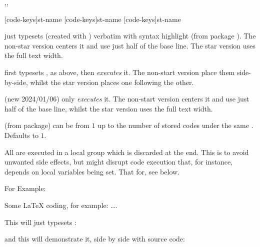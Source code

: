 \documentclass{article}
\begin{document}
\begin{codedescribe}[code,update=2024/01/06,update=2025/04/29]{\tscode*,\tsdemo*,\tsresult*}
\begin{codesyntax}%
		\tsmacro{\tscode*}[code-keys]{st-name}
		\tsmacro{\tsdemo*}[code-keys]{st-name}
		\tsmacro{\tsresult*}[code-keys]{st-name}
\end{codesyntax}
\tsmacro{\tscode*}{} just typesets  (created with ) verbatim with syntax highlight (from  package \cite{listings}). The non-star version centers it and use just half of the base line. The star version uses the full text width.

\tsmacro{\tsdemo*}{} first typesets , as above, then \emph{executes} it. The non-start version place them side-by-side, whilst the star version places one following the other.

(new 2024/01/06) \tsmacro{\tsresult*}{} only \emph{executes} it. The non-start version centers it and use just half of the base line, whilst the star version uses the full text width.
\end{codedescribe}

\begin{tsremark}
  (from  package)  can be from $1$ up to the number of stored codes under the same . Defaults to $1$.
\end{tsremark}

\begin{tsremark}
  All are executed in a local group which is discarded at the end. This is to avoid unwanted side effects, but might disrupt code execution that, for instance, depends on local variables being set. That for, see \tsobj{\tsexec} below.
\end{tsremark}

For Example:
\begin{codestore}[st=democodestore]
\begin{codestore}[stmeta]
		Some \LaTeX{} coding, for example: \ldots.
\end{codestore}  

This will just typesets :

and this will demonstrate it, side by side with source code:
\end{codestore}
\end{document}
